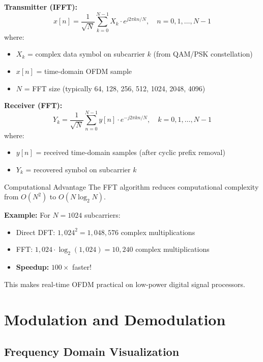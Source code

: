 \textbf{Transmitter (IFFT):}
\begin{equation}
x[n] = \frac{1}{\sqrt{N}} \sum_{k=0}^{N-1} X_k \cdot e^{j2\pi kn/N}, \quad n = 0, 1, \ldots, N-1
\end{equation}
where:
\begin{itemize}
\item $X_k$ = complex data symbol on subcarrier $k$ (from QAM/PSK constellation)
\item $x[n]$ = time-domain OFDM sample
\item $N$ = FFT size (typically 64, 128, 256, 512, 1024, 2048, 4096)
\end{itemize}

\textbf{Receiver (FFT):}
\begin{equation}
Y_k = \frac{1}{\sqrt{N}} \sum_{n=0}^{N-1} y[n] \cdot e^{-j2\pi kn/N}, \quad k = 0, 1, \ldots, N-1
\end{equation}
where:
\begin{itemize}
\item $y[n]$ = received time-domain samples (after cyclic prefix removal)
\item $Y_k$ = recovered symbol on subcarrier $k$
\end{itemize}

\begin{calloutbox}{Computational Advantage}
The FFT algorithm reduces computational complexity from $O(N^2)$ to $O(N \log_2 N)$.

\textbf{Example:} For $N = 1024$ subcarriers:
\begin{itemize}
\item Direct DFT: $1{,}024^2 = 1{,}048{,}576$ complex multiplications
\item FFT: $1{,}024 \cdot \log_2(1{,}024) = 10{,}240$ complex multiplications
\item \textbf{Speedup:} $100\times$ faster!
\end{itemize}

This makes real-time OFDM practical on low-power digital signal processors.
\end{calloutbox}

\section{Modulation and Demodulation}

\subsection{Frequency Domain Visualization}

